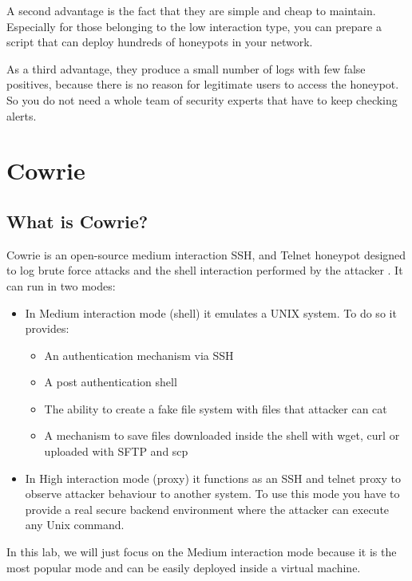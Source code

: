 \documentclass[epsfig,a4paper,11pt,titlepage,oneside,openany]{book}
\begin{document}
A second advantage is the fact that they are simple and cheap  to maintain. Especially for those belonging to the low interaction type, you can prepare a script that can deploy hundreds of honeypots in your network.

As a third advantage, they produce a small number of logs with few false positives, because there is no reason for legitimate users to access the honeypot. So you do not need a whole team of security experts that have to keep checking alerts.

\chapter{Cowrie}

\section{What is Cowrie?}

Cowrie is an open-source medium interaction SSH, and Telnet honeypot designed to log brute force attacks and the shell interaction performed by the attacker \cite{whatcowrie}.
It can run in two modes:
\begin{itemize}
\itemsep0em 
\item In Medium interaction mode (shell) it emulates a UNIX system. To do so it provides:
	\begin{itemize}
	\itemsep0em 
	\item An authentication mechanism via SSH
	\item A  post authentication shell
	\item The ability to create a fake file system with files that attacker can cat
	\item A mechanism to save files downloaded inside the shell with wget, curl or uploaded with SFTP and scp
	\end{itemize}
\item In High interaction mode (proxy) it functions as an SSH and telnet proxy to observe attacker behaviour to another system. To use this mode you have to provide a real secure backend environment where the attacker can execute any Unix command.
\end{itemize}

\noindent In this lab, we will just focus on the Medium interaction mode because it is the most popular mode and can be easily deployed inside a virtual machine.
\end{document}
